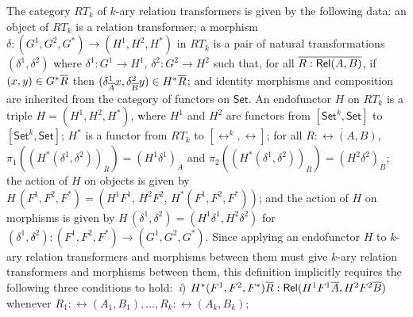 \documentclass[runningheads]{llncs}
\newcommand{\set}{\mathsf{Set}}
\begin{document}
The category $RT_k$ of $k$-ary relation transformers is given by the
following data:
an object of $RT_k$ is a relation transformer;
a morphism $\delta : (G^1,G^2,G^*) \to (H^1,H^2,H^*)$ in $RT_k$
  is a pair of natural transformations $(\delta^1, \delta^2)$ where
  $\delta^1 : G^1 \to H^1$, $\delta^2 : G^2 \to H^2$ such that, for
  all $\overline{R : \mathsf{Rel}(A, B)}$, if $(x, y) \in G^*\overline{R}$ then
  $(\delta^1_{\overline{A}}x, \delta^2_{\overline{B}}y) \in H^*\overline{R}$; and
  identity morphisms and composition are inherited from the
  category of functors on $\set$.
%
An endofunctor $H$ on $RT_k$ is a triple $H = (H^1,H^2,H^*)$, where
$H^1$ and $H^2$ are functors from $[\set^k,\set]$ to $[\set^k,\set]$;
$H^*$ is a functor from $RT_k$ to $[\rel^k,\rel]$;
for all $\overline{R : \rel(A,B)}$,
  $\pi_1((H^*(\delta^1,\delta^2))_{\overline{R}}) = (H^1
  \delta^1)_{\overline{A}}$ and
  $\pi_2((H^*(\delta^1,\delta^2))_{\overline{R}}) = (H^2
  \delta^2)_{\overline{B}}$;
the action of $H$ on objects is given by $H\,(F^1,F^2,F^*) =
  (H^1F^1,\,H^2F^2,\,H^*(F^1,F^2,F^*))$; and 
the action of $H$ on morphisms is given by
  $H\,(\delta^1,\delta^2) = (H^1\delta^1,H^2\delta^2)$ for
  $(\delta^1,\delta^2) : (F^1,F^2,F^*)\to (G^1,G^2,G^*)$.
Since applying an endofunctor $H$ to $k$-ary relation transformers and
morphisms between them must give $k$-ary relation transformers
and morphisms between them, this definition
implicitly requires the following three conditions to hold: \,{\em i})
$H^*(F^1,F^2,F^*) \overline{R} : \mathsf{Rel}(H^1F^1 \overline{A}, H^2F^2 \overline{B})$
whenever $R_1:\rel(A_1,B_1),...,R_k:\rel(A_k,B_k)$;
\end{document}
